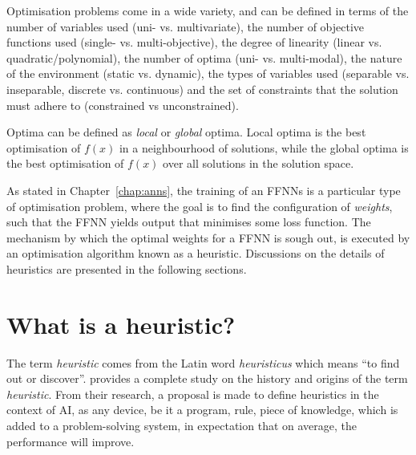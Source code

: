 \noindent
Optimisation problems come in a wide variety, and can be defined in terms of the number of variables used (uni- vs. multivariate), the number of objective functions used (single- vs. multi-objective), the degree of linearity (linear vs. quadratic/polynomial), the number of optima (uni- vs. multi-modal), the nature of the environment (static vs. dynamic), the types of variables used (separable vs. inseparable, discrete vs. continuous) and the set of constraints that the solution must adhere to (constrained vs unconstrained).

Optima can be defined as \textit{local} or \textit{global} optima. Local optima is the best optimisation of $f(x)$ in a neighbourhood of solutions, while the global optima is the best optimisation of $f(x)$ over all solutions in the solution space.

As stated in Chapter~\ref{chap:anns}, the training of an \acp{FFNN} is a particular type of optimisation problem, where the goal is to find the configuration of \textit{weights}, such that the \ac{FFNN} yields output that minimises some loss function. The mechanism by which the optimal weights for a \acs{FFNN} is sough out, is executed by an optimisation algorithm known as a heuristic. Discussions on the details of heuristics are presented in the following sections.

\section{What is a heuristic?}\label{sec:heuristics:what_is_a_heuristic}

The term \textit{heuristic} comes from the Latin word \textit{heuristicus} which means ``to find out or discover''. \citeauthor{ref:romanycia:1985} \cite{ref:romanycia:1985} provides a complete study on the history and origins of the term \textit{heuristic}. From their research, a proposal is made to define heuristics in the context of \ac{AI}, as any device, be it a program, rule, piece of knowledge, which is added to a problem-solving system, in expectation that on average, the performance will improve.

